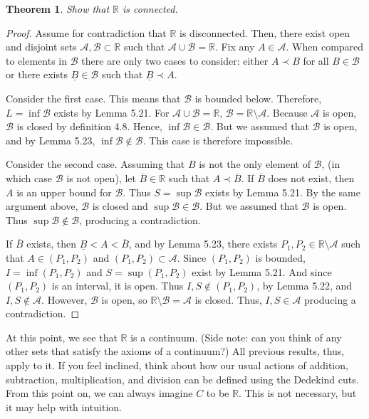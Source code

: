 \documentclass{amsart}
\newtheorem{theorem}{Theorem}
\newcommand{\R}{\mathbb R}
\newcommand{\1}{\mathds{1}}
\newcommand{\cA}{\mathcal A}
\newcommand{\cB}{\mathcal B}
\def \R {{\mathbb {R}}}
\numberwithin{equation}{section}
\numberwithin{theorem}{section}
\begin{document}
\begin{theorem}
	Show that $\R$ is connected.
\end{theorem}

\begin{proof}
	Assume for contradiction that $\R$ is disconnected. Then, there exist open and disjoint sets $\cA,\cB\subset \R$ such that $\cA \cup \cB = \R$. Fix any $A\in \cA$. When compared to elements in $\cB$ there are only two cases to consider: either $A\prec B$ for all $B\in \cB$ or there exists $\underline{B}\in \cB$ such that $\underline{B}\prec A$.
	
	Consider the first case. This means that $\cB$ is bounded below. Therefore, $L = \inf \cB$ exists by Lemma 5.21. For $\cA \cup \cB = \R$, $\cB = \R\setminus \cA$. Because $\cA$ is open, $\cB$ is closed by definition 4.8. Hence, $\inf \cB \in \cB$. But we assumed that $\cB$ is open, and by Lemma 5.23, $\inf \cB \notin \cB$. This case is therefore impossible.
	
	Consider the second case. Assuming that $B$ is not the only element of $\cB$, (in which case $\cB$ is not open), let $\overline{B}\in \R$ such that $A\prec \overline{B}$. If $\overline{B}$ does not exist, then $A$ is an upper bound for $\cB$. Thus $S = \sup \cB$ exists by Lemma 5.21. By the same argument above, $\cB$ is closed and $\sup \cB \in \cB$. But we assumed that $\cB$ is open. Thus $\sup \cB \notin \cB$, producing a contradiction. 
	
	If $\overline{B}$ exists, then $\underline B < A < \overline B$, and by Lemma 5.23, there exists $P_1, P_2 \in \R\setminus \cA$ such that $A\in (P_1,P_2)$ and $(P_1, P_2)\subset \cA$. Since $(P_1, P_2)$ is bounded, $I = \inf (P_1, P_2)$ and $S = \sup (P_1, P_2)$ exist by Lemma 5.21. And since $(P_1, P_2)$ is an interval, it is open. Thus $I,S\notin (P_1, P_2)$, by Lemma 5.22, and $I,S\notin \cA$. However, $\cB$ is open, so $\R\setminus \cB = \cA$ is closed. Thus, $I,S\in \cA$ producing a contradiction.
\end{proof}

At this point, we see that $\R$ is a continuum.  (Side note: can you think of any other sets that satisfy the axioms of a continuum?)  All previous results, thus, apply to it.  If you feel inclined, think about how our usual actions of addition, subtraction, multiplication, and division can be defined using the Dedekind cuts.  From this point on, we can always imagine $C$ to be $\R$.  This is not necessary, but it may help with intuition.
\end{document}
